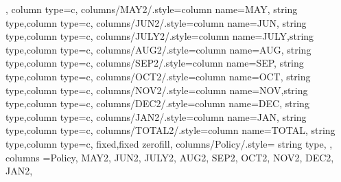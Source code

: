 \begin{table*}[h]
{{        }
    },
    column type=c,
    columns/MAY2/.style={column name={MAY}, string type,column type=c}, 
    columns/JUN2/.style={column name={JUN}, string type,column type=c}, 
    columns/JULY2/.style={column name={JULY},string type,column type=c}, 
    columns/AUG2/.style={column name={AUG}, string type,column type=c}, 
    columns/SEP2/.style={column name={SEP}, string type,column type=c}, 
    columns/OCT2/.style={column name={OCT}, string type,column type=c}, 
    columns/NOV2/.style={column name={NOV},string type,column type=c}, 
    columns/DEC2/.style={column name={DEC}, string type,column type=c}, 
    columns/JAN2/.style={column name={JAN}, string type,column type=c},
    columns/TOTAL2/.style={column name={TOTAL}, string type,column type=c},
    fixed,fixed zerofill,     %
    columns/Policy/.style={
        string type,
      },
    columns ={Policy, MAY2, JUN2, JULY2, AUG2, SEP2, OCT2, NOV2, DEC2, JAN2},

\end{table*}
